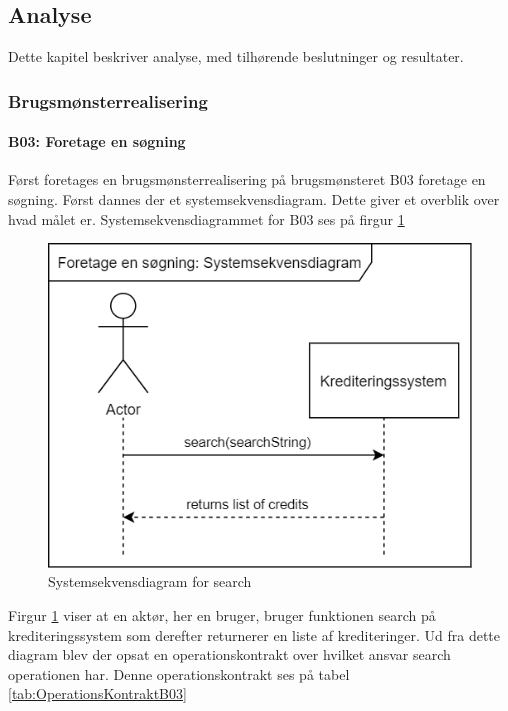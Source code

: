 \subsection{Analyse}

Dette kapitel beskriver analyse, med tilhørende beslutninger og resultater.

\subsubsection{Brugsmønsterrealisering}

\paragraph{B03: Foretage en søgning} Først foretages en brugsmønsterrealisering på brugsmønsteret B03 foretage en søgning. Først dannes der et systemsekvensdiagram. Dette giver et overblik over hvad målet er. Systemsekvensdiagrammet for B03 ses på firgur \ref{fig:SystemsekvensdiagramSearch} 

\begin{figure}[H]
    \centering
\includegraphics[scale = 0.5]{images/B03SSD.png}
    \caption{Systemsekvensdiagram for search}
    \label{fig:SystemsekvensdiagramSearch}
\end{figure}

Firgur \ref{fig:SystemsekvensdiagramSearch} viser at en aktør, her en bruger, bruger funktionen search på krediteringssystem som derefter returnerer en liste af krediteringer. Ud fra dette diagram blev der opsat en operationskontrakt over hvilket ansvar search operationen har. Denne operationskontrakt ses på tabel \ref{tab:OperationsKontraktB03}

